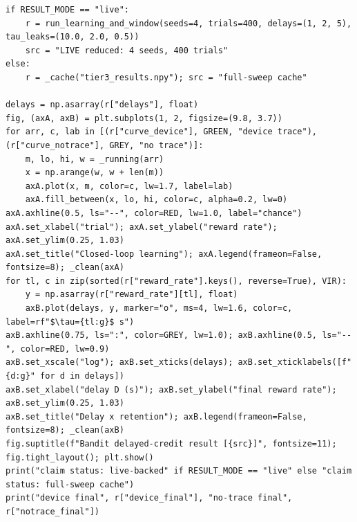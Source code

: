 \begin{lstlisting}[caption={02\_closed\_loop\_rl.ipynb code cell 2},label={lst:mrl-nb-02-closed-loop-rl-2}]
if RESULT_MODE == "live":
    r = run_learning_and_window(seeds=4, trials=400, delays=(1, 2, 5), tau_leaks=(10.0, 2.0, 0.5))
    src = "LIVE reduced: 4 seeds, 400 trials"
else:
    r = _cache("tier3_results.npy"); src = "full-sweep cache"

delays = np.asarray(r["delays"], float)
fig, (axA, axB) = plt.subplots(1, 2, figsize=(9.8, 3.7))
for arr, c, lab in [(r["curve_device"], GREEN, "device trace"), (r["curve_notrace"], GREY, "no trace")]:
    m, lo, hi, w = _running(arr)
    x = np.arange(w, w + len(m))
    axA.plot(x, m, color=c, lw=1.7, label=lab)
    axA.fill_between(x, lo, hi, color=c, alpha=0.2, lw=0)
axA.axhline(0.5, ls="--", color=RED, lw=1.0, label="chance")
axA.set_xlabel("trial"); axA.set_ylabel("reward rate"); axA.set_ylim(0.25, 1.03)
axA.set_title("Closed-loop learning"); axA.legend(frameon=False, fontsize=8); _clean(axA)
for tl, c in zip(sorted(r["reward_rate"].keys(), reverse=True), VIR):
    y = np.asarray(r["reward_rate"][tl], float)
    axB.plot(delays, y, marker="o", ms=4, lw=1.6, color=c, label=rf"$\tau={tl:g}$ s")
axB.axhline(0.75, ls=":", color=GREY, lw=1.0); axB.axhline(0.5, ls="--", color=RED, lw=0.9)
axB.set_xscale("log"); axB.set_xticks(delays); axB.set_xticklabels([f"{d:g}" for d in delays])
axB.set_xlabel("delay D (s)"); axB.set_ylabel("final reward rate"); axB.set_ylim(0.25, 1.03)
axB.set_title("Delay x retention"); axB.legend(frameon=False, fontsize=8); _clean(axB)
fig.suptitle(f"Bandit delayed-credit result [{src}]", fontsize=11); fig.tight_layout(); plt.show()
print("claim status: live-backed" if RESULT_MODE == "live" else "claim status: full-sweep cache")
print("device final", r["device_final"], "no-trace final", r["notrace_final"])
\end{lstlisting}

